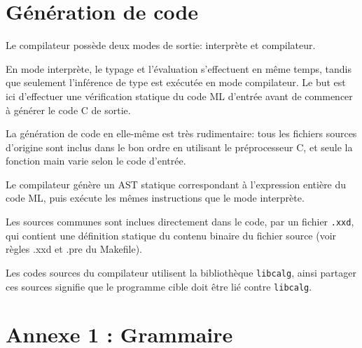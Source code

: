 \documentclass[paper=a4, fontsize=11pt]{scrartcl}
\numberwithin{equation}{section}		%
\numberwithin{figure}{section}			%
\numberwithin{table}{section}				%
\begin{document}
\newpage
\section{Génération de code}

Le compilateur possède deux modes de sortie: interprète et compilateur.

En mode interprète, le typage et l'évaluation s'effectuent en même temps, tandis que seulement l'inférence de type est exécutée en mode compilateur.
Le but est ici d'effectuer une vérification statique du code ML d'entrée avant de commencer à générer le code C de sortie.

La génération de code en elle-même est très rudimentaire: tous les fichiers sources d'origine sont inclus dans le bon ordre en utilisant le préprocesseur C, et seule la fonction main varie selon le code d'entrée.

Le compilateur génère un AST statique correspondant à l'expression entière du code ML, puis exécute les mêmes instructions que le mode interprète.

Les sources communes sont inclues directement dans le code, par un fichier \texttt{.xxd}, qui contient une définition statique du contenu binaire du fichier source (voir règles .xxd et .pre du Makefile).

Les codes sources du compilateur utilisent la bibliothèque \texttt{libcalg}, ainsi partager ces sources signifie que le programme cible doit être lié contre \texttt{libcalg}.

\newpage
\section{Annexe 1 : Grammaire}
\end{document}
